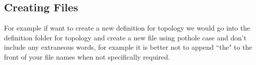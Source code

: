 \subsection*{Creating Files}

For example if want to create a new definition for topology we would go into the definition folder for topology and create a new file using pothole case and don't include any extraneous words, for example it is better not to append ``the" to the front of your file names when not specifically required.
